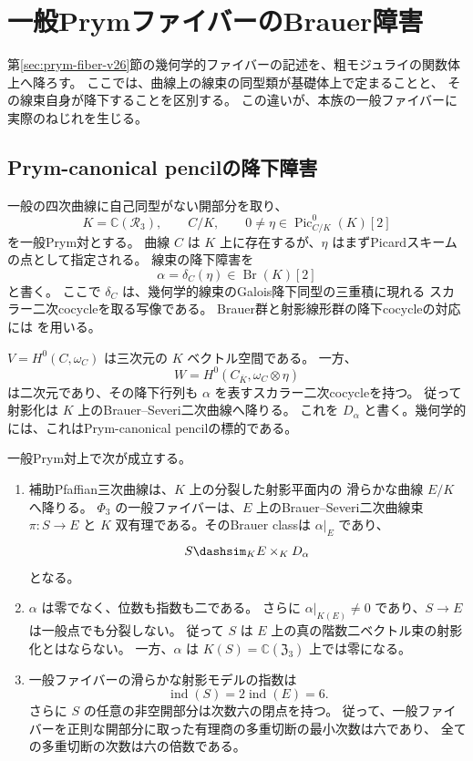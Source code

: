 \section{一般PrymファイバーのBrauer障害}
\label{sec:prym-brauer-v27}

第\ref{sec:prym-fiber-v26}節の幾何学的ファイバーの記述を、粗モジュライの関数体上へ降ろす。
ここでは、曲線上の線束の同型類が基礎体上で定まることと、
その線束自身が降下することを区別する。
この違いが、本族の一般ファイバーに実際のねじれを生じる。

\subsection{Prym-canonical pencilの降下障害}
一般の四次曲線に自己同型がない開部分を取り、
\[
 K=\mathbb C(\mathcal R_3),\qquad
 C/K,\qquad
 0\ne\eta\in\operatorname{Pic}^0_{C/K}(K)[2]
\]
を一般Prym対とする。
曲線 $C$ は $K$ 上に存在するが、$\eta$ はまずPicardスキームの点として指定される。
線束の降下障害を
\[
 \alpha=\delta_C(\eta)\in\operatorname{Br}(K)[2]
\]
と書く。
ここで $\delta_C$ は、幾何学的線束のGalois降下同型の三重積に現れる
スカラー二次cocycleを取る写像である。
Brauer群と射影線形群の降下cocycleの対応には
\cite[Tags 03R1, 0A2J]{StacksBrauerV27}を用いる。

$V=H^0(C,\omega_C)$ は三次元の $K$ ベクトル空間である。
一方、
\[
 W=H^0(C_{\overline K},\omega_C\otimes\eta)
\]
は二次元であり、その降下行列も $\alpha$ を表すスカラー二次cocycleを持つ。
従って射影化は $K$ 上のBrauer--Severi二次曲線へ降りる。
これを $D_\alpha$ と書く。幾何学的には、これはPrym-canonical pencilの標的である。

\begin{theorem}[一般ファイバーの非自明なねじれ]
\label{thm:prym-brauer-v27}
一般Prym対上で次が成立する。
\begin{enumerate}
\item 補助Pfaffian三次曲線は、$K$ 上の分裂した射影平面内の
滑らかな曲線 $E/K$ へ降りる。
$\Phi_3$ の一般ファイバーは、$E$ 上のBrauer--Severi二次曲線束
$\pi:S\to E$ と $K$ 双有理である。そのBrauer classは $\alpha|_E$ であり、
\[
 S\dashsim_K E\times_KD_\alpha
\]
となる。
\item $\alpha$ は零でなく、位数も指数も二である。
さらに $\alpha|_{K(E)}\ne0$ であり、$S\to E$ は一般点でも分裂しない。
従って $S$ は $E$ 上の真の階数二ベクトル束の射影化とはならない。
一方、$\alpha$ は $K(S)=\mathbb C(\mathfrak Z_3)$ 上では零になる。
\item 一般ファイバーの滑らかな射影モデルの指数は
\[
 \operatorname{ind}(S)=2\operatorname{ind}(E)=6.
\]
さらに $S$ の任意の非空開部分は次数六の閉点を持つ。
従って、一般ファイバーを正則な開部分に取った有理商の多重切断の最小次数は六であり、
全ての多重切断の次数は六の倍数である。
\end{enumerate}
\end{theorem}

